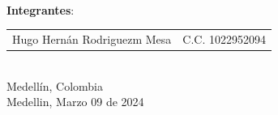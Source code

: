 \begin{titlepage}
\begin{minipage}{13.5cm}
\HRule \\[1.5cm]

{\large \textbf{Integrantes}:\\[0.3cm]

\begin{tabular}{cc}
Hugo Hernán Rodriguezm Mesa & C.C. 1022952094\\
\end{tabular}
}\\[2.5cm]

{\large
Medellín, Colombia
}\\[0.3cm]

{\large
Medellin, Marzo 09 de 2024
}

\end{minipage}

\vfill %

\end{titlepage}




